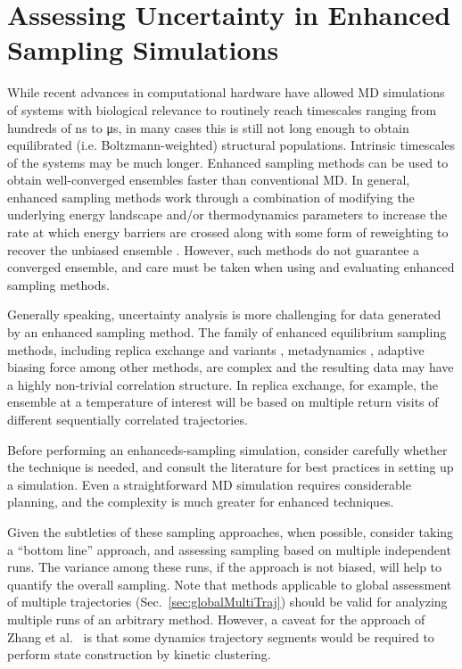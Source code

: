 \section{Assessing Uncertainty in Enhanced Sampling Simulations}
\label{sec:enhanced}

While recent advances in computational hardware have allowed MD simulations of systems with biological relevance to routinely reach timescales ranging from hundreds of \si{\nano\second} to \si{\micro\second}, in many cases this is still not long enough to obtain equilibrated (i.e. Boltzmann-weighted) structural populations.  Intrinsic timescales of the systems may be much longer.
Enhanced sampling methods can be used to obtain well-converged ensembles faster than conventional MD. In general, enhanced sampling methods work through a combination of modifying the underlying energy landscape and/or thermodynamics parameters to increase the rate at which energy barriers are crossed along with some form of reweighting to recover the unbiased ensemble \cite{Zuckerman2011}. However, such methods do not guarantee a converged ensemble, and care must be taken when using and evaluating enhanced sampling methods.

Generally speaking, uncertainty analysis is more challenging for data generated by an enhanced sampling method.
The family of enhanced equilibrium sampling methods, including replica exchange and variants \cite{Swendsen-1986,Sugita1999,Okamoto-2000}, metadynamics \cite{Bussi2006a,Laio2008}, adaptive biasing force \cite{Darve2001,Darve2008,Comer2015} among other methods, are complex and the resulting data may have a highly non-trivial correlation structure.
In replica exchange, for example, the ensemble at a temperature of interest will be based on multiple return visits of different sequentially correlated trajectories.

Before performing an enhanceds-sampling simulation, consider carefully whether the technique is needed, and consult the literature for best practices in setting up a simulation.
Even a straightforward MD simulation requires considerable planning, and the complexity is much greater for enhanced techniques.

Given the subtleties of these sampling approaches, when possible, consider taking a ``bottom line'' approach, and assessing sampling based on multiple independent runs.
The variance among these runs, if the approach is not biased, will help to quantify the overall sampling.
Note that methods applicable to global assessment of multiple trajectories (Sec.\ \ref{sec:globalMultiTraj}) should be valid for analyzing multiple runs of an arbitrary method.
However, a caveat for the approach of Zhang et al.\ \cite{Zhang2010} is that some dynamics trajectory segments would be required to perform state construction by kinetic clustering.

